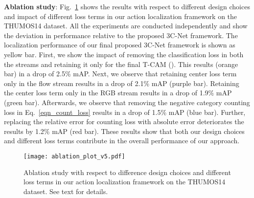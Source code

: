 \documentclass[10pt,twocolumn,letterpaper]{article}
\begin{document}
\noindent\textbf{Ablation study}: Fig.~\ref{fig_ablation} shows the results with respect to different design choices and impact of different loss terms in our action localization framework on the THUMOS14 dataset. All the experiments are conducted independently and show the deviation in performance relative to the proposed 3C-Net framework. The localization performance of our final proposed 3C-Net framework is shown as yellow bar. First, we show the impact of removing the classification loss in both the streams and retaining it only for the final T-CAM (). This results (orange bar) in a drop of 2.5\% mAP. Next, we observe that retaining center loss term only in the flow stream results in a drop of 2.1\% mAP (purple bar). Retaining the center loss term only in the RGB stream results in a drop of 1.9\% mAP (green bar). Afterwards, we observe that removing the negative category counting loss in Eq.~\ref{eqn_count_loss} results in a drop of 1.5\% mAP (blue bar). Further, replacing the relative error for counting loss with absolute error deteriorates the results by 1.2\% mAP (red bar). 
These results show that both our design choices and different loss terms contribute in the overall performance of our approach.   


\begin{table}[t]
\centering
{}
 \caption{\label{tab_baseline}Baseline action localization performance comparison (mAP) on THUMOS14 at IoU=0.5. Our 3C-Net achieves an absolute gain of 7.5\% in terms of mAP, compared to the baseline. }\vspace{-0.3cm}
\end{table}

\begin{figure}[t]
    \centering
    \texttt{[image: ablation\_plot\_v5.pdf]}\vspace{-0.1cm}
    \caption{Ablation study with respect to difference design choices and different loss terms in our action localization framework on the THUMOS14 dataset. See text for details.}\vspace{-0.3cm}
    \label{fig_ablation}
\end{figure}
\end{document}
